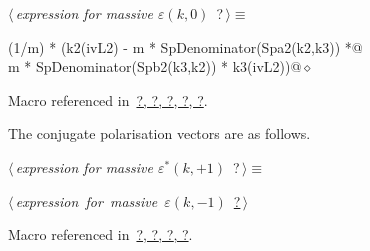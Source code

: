 \documentclass[a4paper,12pt]{amsart}
\renewcommand{\NWtarget}[2]{\hypertarget{#1}{#2}}
\renewcommand{\NWlink}[2]{\hyperlink{#1}{#2}}
\renewcommand{\NWtxtMacroRefIn}{Macro referenced in}
\renewcommand{\NWsep}{${\diamond}$}
\begin{document}
\begin{flushleft} \small
\begin{minipage}{\linewidth}\label{scrap26}\raggedright\small
\NWtarget{nuweb?}{} $\langle\,${\it expression for massive $\varepsilon(k, 0)$}\nobreak\ {\footnotesize {?}}$\,\rangle\equiv$
\vspace{-1ex}
\begin{list}{}{} \item
\mbox{}\verb@(1/m) * (k2(ivL2) - m * SpDenominator(Spa2(k2,k3)) *@\\
\mbox{}\verb@   m * SpDenominator(Spb2(k3,k2)) * k3(ivL2))@{\NWsep}
\end{list}
\vspace{-1.5ex}
\footnotesize
\begin{list}{}{\setlength{\itemsep}{-\parsep}\setlength{\itemindent}{-\leftmargin}}
\item \NWtxtMacroRefIn\ \NWlink{nuweb?}{?}\NWlink{nuweb?}{, ?}\NWlink{nuweb?}{, ?}\NWlink{nuweb?}{, ?}\NWlink{nuweb?}{, ?}.

\item{}
\end{list}
\end{minipage}\vspace{4ex}
\end{flushleft}
The conjugate polarisation vectors are as follows.
\begin{flushleft} \small
\begin{minipage}{\linewidth}\label{scrap27}\raggedright\small
\NWtarget{nuweb?}{} $\langle\,${\it expression for massive $\varepsilon^\ast(k, +1)$}\nobreak\ {\footnotesize {?}}$\,\rangle\equiv$
\vspace{-1ex}
\begin{list}{}{} \item
\mbox{}\verb@@\hbox{$\langle\,${\it expression for massive $\varepsilon(k, -1)$}\nobreak\ {\footnotesize \NWlink{nuweb?}{?}}$\,\rangle$}\verb@@{\NWsep}
\end{list}
\vspace{-1.5ex}
\footnotesize
\begin{list}{}{\setlength{\itemsep}{-\parsep}\setlength{\itemindent}{-\leftmargin}}
\item \NWtxtMacroRefIn\ \NWlink{nuweb?}{?}\NWlink{nuweb?}{, ?}\NWlink{nuweb?}{, ?}\NWlink{nuweb?}{, ?}.

\item{}
\end{list}
\end{minipage}\vspace{4ex}
\end{flushleft}
\end{document}
